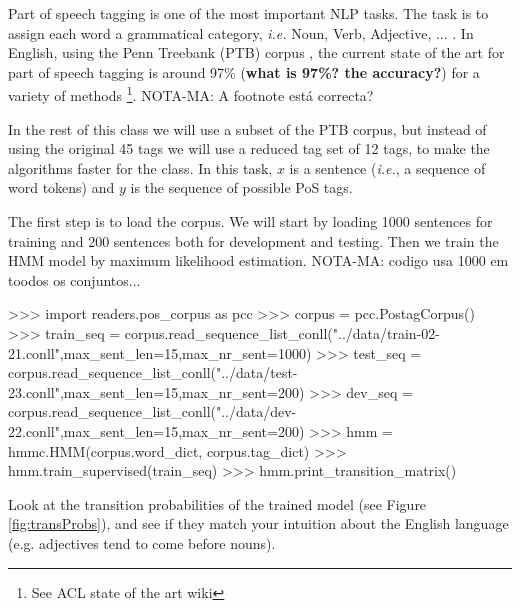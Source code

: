 Part of speech tagging is one of the most important NLP tasks. The
task is to assign each word a grammatical category, \emph{i.e.} Noun,
Verb, Adjective, ... . In English, using the Penn Treebank (PTB) corpus \citep{pennTreeBank}, the current
state of the art for part of speech tagging is around 97\% (\textbf{what is 97\%? the accuracy?})
for a variety of methods \footnote{See ACL state of the art wiki}. 
NOTA-MA: A footnote está correcta?

In the rest of this class we will use a subset of the PTB corpus, but
instead of using the original 45 tags we will use a reduced tag set of
12 tags, to make the algorithms faster for the
class. In this task, $x$ is a sentence (\emph{i.e.}, a sequence of word tokens) and $y$
is the sequence of possible PoS tags.

The first step is to load the corpus. We will start by loading
1000 sentences for training and 200 sentences both for development and
testing. Then we train the HMM model by maximum likelihood estimation.
NOTA-MA: codigo usa 1000 em toodos os conjuntos... 
\begin{python}
>>> import readers.pos_corpus as pcc
>>> corpus = pcc.PostagCorpus()
>>> train_seq = corpus.read_sequence_list_conll("../data/train-02-21.conll",max_sent_len=15,max_nr_sent=1000)
>>> test_seq = corpus.read_sequence_list_conll("../data/test-23.conll",max_sent_len=15,max_nr_sent=200)
>>> dev_seq = corpus.read_sequence_list_conll("../data/dev-22.conll",max_sent_len=15,max_nr_sent=200)
>>> hmm = hmmc.HMM(corpus.word_dict, corpus.tag_dict)
>>> hmm.train_supervised(train_seq)
>>> hmm.print_transition_matrix()
\end{python}


Look at the transition probabilities of the trained model
 (see
Figure \ref{fig:transProbs}), and see if they match your intuition
about the English language (e.g. adjectives tend to come before nouns).

